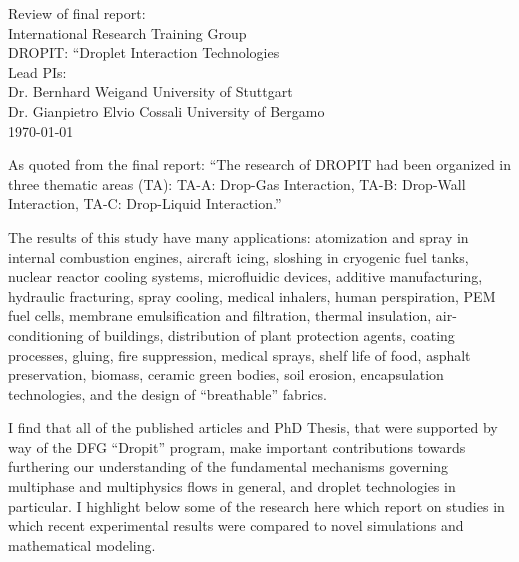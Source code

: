 


\begin{center}
Review of final report: \\
International Research Training Group \\
DROPIT: ``Droplet Interaction Technologies \\
Lead PIs: \\
Dr. Bernhard Weigand University of Stuttgart \\
Dr. Gianpietro Elvio Cossali  University of Bergamo \\
\today  \\
\end{center}
As quoted from the final report:
``The research of DROPIT had been organized in three
thematic areas (TA): TA-A: Drop-Gas Interaction, 
TA-B: Drop-Wall Interaction, TA-C: Drop-Liquid Interaction.''  
\par\noindent
The results of this study have many applications: atomization and spray
in internal combustion engines, aircraft icing, sloshing in cryogenic
fuel tanks, nuclear reactor cooling systems, microfluidic devices, 
additive manufacturing, hydraulic fracturing, spray cooling,
medical inhalers, human perspiration, PEM fuel cells, membrane
emulsification and filtration, thermal insulation, 
air-conditioning of buildings, distribution of plant protection
agents, coating processes, gluing, fire suppression,
medical sprays, 
shelf life of food, asphalt preservation, biomass,
ceramic green bodies, soil erosion, encapsulation technologies,
and the design of ``breathable'' fabrics.
\par\noindent
I find that all of the published articles and PhD Thesis, that were supported
by way of the DFG ``Dropit'' program,  make important
contributions towards furthering our understanding of the 
fundamental mechanisms governing multiphase and multiphysics
flows in general, and droplet
technologies in particular.  I highlight below some
of the research here which report on 
studies in which recent experimental results
were compared to novel simulations and mathematical modeling.

